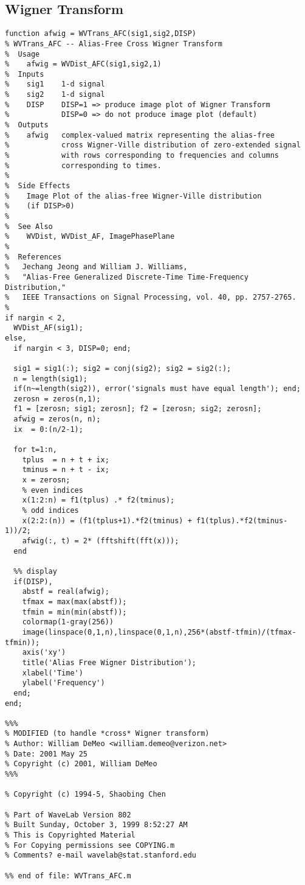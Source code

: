 \subsection{Wigner Transform}\label{sec:WVTrans_AFC}
\begin{verbatim}
function afwig = WVTrans_AFC(sig1,sig2,DISP)
% WVTrans_AFC -- Alias-Free Cross Wigner Transform
%  Usage
%    afwig = WVDist_AFC(sig1,sig2,1)
%  Inputs
%    sig1    1-d signal
%    sig2    1-d signal
%    DISP    DISP=1 => produce image plot of Wigner Transform
%            DISP=0 => do not produce image plot (default)
%  Outputs
%    afwig   complex-valued matrix representing the alias-free
%            cross Wigner-Ville distribution of zero-extended signal
%            with rows corresponding to frequencies and columns
%            corresponding to times.
%
%  Side Effects
%    Image Plot of the alias-free Wigner-Ville distribution 
%    (if DISP>0)
%
%  See Also
%    WVDist, WVDist_AF, ImagePhasePlane
%
%  References
%   Jechang Jeong and William J. Williams,
%   "Alias-Free Generalized Discrete-Time Time-Frequency Distribution,"
%   IEEE Transactions on Signal Processing, vol. 40, pp. 2757-2765.
%
if nargin < 2,
  WVDist_AF(sig1); 
else,
  if nargin < 3, DISP=0; end;
  
  sig1 = sig1(:); sig2 = conj(sig2); sig2 = sig2(:);
  n = length(sig1);
  if(n~=length(sig2)), error('signals must have equal length'); end;
  zerosn = zeros(n,1);
  f1 = [zerosn; sig1; zerosn]; f2 = [zerosn; sig2; zerosn];
  afwig = zeros(n, n);
  ix  = 0:(n/2-1);
  
  for t=1:n,
    tplus  = n + t + ix;
    tminus = n + t - ix;
    x = zerosn;
    % even indices
    x(1:2:n) = f1(tplus) .* f2(tminus); 
    % odd indices    
    x(2:2:(n)) = (f1(tplus+1).*f2(tminus) + f1(tplus).*f2(tminus-1))/2; 
    afwig(:, t) = 2* (fftshift(fft(x)));
  end

  %% display
  if(DISP),
    abstf = real(afwig);
    tfmax = max(max(abstf));
    tfmin = min(min(abstf));
    colormap(1-gray(256))
    image(linspace(0,1,n),linspace(0,1,n),256*(abstf-tfmin)/(tfmax-tfmin));
    axis('xy')
    title('Alias Free Wigner Distribution');
    xlabel('Time')
    ylabel('Frequency')
  end;
end;

%%% 
% MODIFIED (to handle *cross* Wigner transform)
% Author: William DeMeo <william.demeo@verizon.net>
% Date: 2001 May 25
% Copyright (c) 2001, William DeMeo
%%%

% Copyright (c) 1994-5, Shaobing Chen

% Part of WaveLab Version 802
% Built Sunday, October 3, 1999 8:52:27 AM
% This is Copyrighted Material
% For Copying permissions see COPYING.m
% Comments? e-mail wavelab@stat.stanford.edu

%% end of file: WVTrans_AFC.m
\end{verbatim}   

